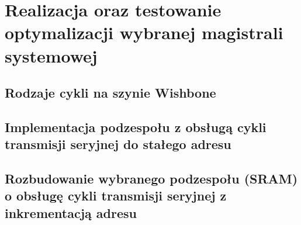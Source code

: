 \section{Realizacja oraz testowanie optymalizacji wybranej magistrali systemowej}

\subsection{Rodzaje cykli na szynie Wishbone}

\subsection{Implementacja podzespołu z obsługą cykli transmisji seryjnej do stałego adresu}

\subsection{Rozbudowanie wybranego podzespołu (SRAM) o obsługę cykli transmisji seryjnej z inkrementacją adresu}
